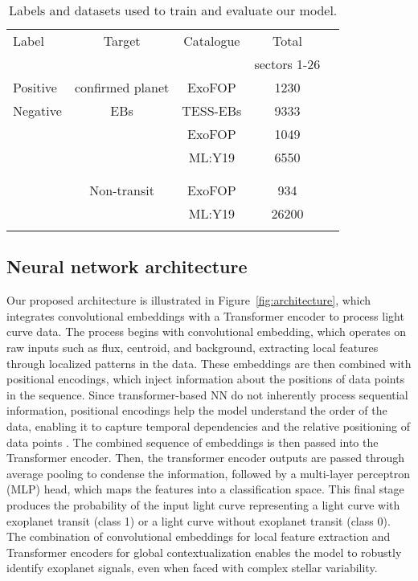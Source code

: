 \begin{table}
	\centering
	\vspace{5mm}
	\caption{Labels and datasets used to train and evaluate our model.}
	\label{tab:ds_gt}
	\vspace{4mm}
	\begin{tabular}{lcccc} 
		\hline
		Label & Target & Catalogue  & Total  \\
		 &  & & sectors 1-26  \\
		\hline
		Positive & confirmed planet & ExoFOP &   1230\\
        \hline
		Negative & EBs & TESS-EBs &  9333 \\
                 & & ExoFOP &  1049 \\
                 & & ML:Y19 &  6550 \\
        \vspace{0.1mm}\\
        \cline{2-4} 
        \vspace{0.1mm}\\
        & Non-transit & ExoFOP &   934  \\
        &  & ML:Y19 &   26200 \\

		\hline
		\vspace{1mm}
	\end{tabular}
\end{table}



\subsection{Neural network architecture}
\label{sec:nn_architecture}


Our proposed architecture is illustrated in Figure~\ref{fig:architecture}, which integrates convolutional embeddings with a Transformer encoder to process light curve data. The process begins with convolutional embedding, which operates on raw inputs such as flux, centroid, and background, extracting local features through localized patterns in the data. These embeddings are then combined with positional encodings, which inject information about the positions of data points in the sequence. Since transformer-based NN do not inherently process sequential information, positional encodings help the model understand the order of the data, enabling it to capture temporal dependencies and the relative positioning of data points \citep{vaswani2017attention}. The combined sequence of embeddings is then passed into the Transformer encoder. Then, the transformer encoder outputs are passed through average pooling to condense the information, followed by a multi-layer perceptron (MLP) head, which maps the features into a classification space. This final stage produces the probability of the input light curve representing a light curve with exoplanet transit (class 1) or a light curve without exoplanet transit (class 0). The combination of convolutional embeddings for local feature extraction and Transformer encoders for global contextualization enables the model to robustly identify exoplanet signals, even when faced with complex stellar variability. \par


